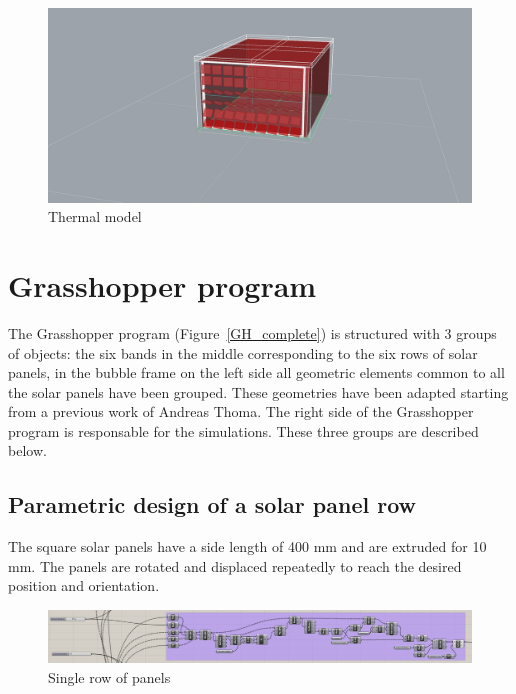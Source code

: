 \begin{figure}[h]
 \centering
 \includegraphics[width=140mm]{graphic/Thermal_model.jpg}
 \caption{Thermal model}
 \label{thermal_model}
\end{figure}

\newpage

\section{Grasshopper program}

The Grasshopper program (Figure~\ref{GH_complete}) is structured with 3 groups of objects: the six bands in the middle corresponding to the six rows of solar panels, in the bubble frame on the left side all geometric elements common to all the solar panels have been grouped. These geometries have been adapted starting from a previous work of Andreas Thoma. The right side of the Grasshopper program is responsable for the simulations. These three groups are described below.

\subsection{Parametric design of a solar panel row}

The square solar panels have a side length of 400 mm and are extruded for 10 mm. The panels are rotated and displaced repeatedly to reach the desired position and orientation.\\

\begin{figure}[h]
 \centering
 \includegraphics[width=150mm]{graphic/GH_panel.jpg}
 \caption{Single row of panels}
 \label{GH_panel}
\end{figure}


